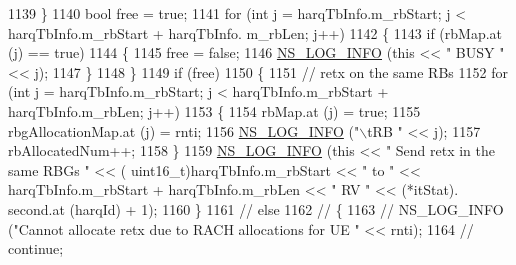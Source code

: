 \begin{DoxyCode}
1139                                 \}
1140                                 \textcolor{keywordtype}{bool} free = \textcolor{keyword}{true};
1141                                 \textcolor{keywordflow}{for} (\textcolor{keywordtype}{int} j = harqTbInfo.m\_rbStart; j < harqTbInfo.m\_rbStart + harqTbInfo.
      m\_rbLen; j++)
1142                                 \{
1143                                         \textcolor{keywordflow}{if} (rbMap.at (j) == \textcolor{keyword}{true})
1144                                         \{
1145                                                 free = \textcolor{keyword}{false};
1146                                                 \hyperlink{group__logging_gafbd73ee2cf9f26b319f49086d8e860fb}{NS\_LOG\_INFO} (\textcolor{keyword}{this} << \textcolor{stringliteral}{" BUSY "} << j);
1147                                         \}
1148                                 \}
1149                                 \textcolor{keywordflow}{if} (free)
1150                                 \{
1151                                         \textcolor{comment}{// retx on the same RBs}
1152                                         \textcolor{keywordflow}{for} (\textcolor{keywordtype}{int} j = harqTbInfo.m\_rbStart; j < harqTbInfo.m\_rbStart + 
      harqTbInfo.m\_rbLen; j++)
1153                                         \{
1154                                                 rbMap.at (j) = \textcolor{keyword}{true};
1155                                                 rbgAllocationMap.at (j) = rnti;
1156                                                 \hyperlink{group__logging_gafbd73ee2cf9f26b319f49086d8e860fb}{NS\_LOG\_INFO} (\textcolor{stringliteral}{"\(\backslash\)tRB "} << j);
1157                                                 rbAllocatedNum++;
1158                                         \}
1159                                         \hyperlink{group__logging_gafbd73ee2cf9f26b319f49086d8e860fb}{NS\_LOG\_INFO} (\textcolor{keyword}{this} << \textcolor{stringliteral}{" Send retx in the same RBGs "} << (
      uint16\_t)harqTbInfo.m\_rbStart << \textcolor{stringliteral}{" to "} << harqTbInfo.m\_rbStart + harqTbInfo.m\_rbLen << \textcolor{stringliteral}{" RV "} << (*itStat).
      second.at (harqId) + 1);
1160                                 \}
1161 \textcolor{comment}{//                              else}
1162 \textcolor{comment}{//                              \{}
1163 \textcolor{comment}{//                                      NS\_LOG\_INFO ("Cannot allocate retx due to RACH allocations for UE "
       << rnti);}
1164 \textcolor{comment}{//                                      continue;}

\end{DoxyCode}
